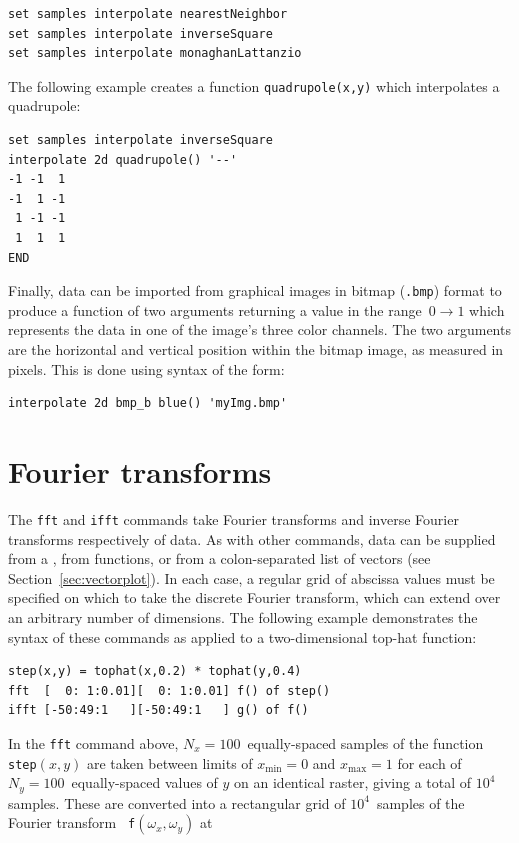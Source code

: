 \begin{verbatim}
set samples interpolate nearestNeighbor
set samples interpolate inverseSquare
set samples interpolate monaghanLattanzio
\end{verbatim}

The following example creates a function {\tt quad\-ru\-pole(x,y)} which interpolates a quadrupole:

\begin{verbatim}
set samples interpolate inverseSquare
interpolate 2d quadrupole() '--'
-1 -1  1
-1  1 -1
 1 -1 -1
 1  1  1
END
\end{verbatim}

Finally, data can be imported from graphical images in bitmap ({\tt .bmp})
format to produce a function of two arguments returning a value in the
range~$0\to1$ which represents the data in one of the image's three color
channels. The two arguments are the horizontal and vertical position within the
bitmap image, as measured in pixels. This is done using syntax of the form:

\begin{verbatim}
interpolate 2d bmp_b blue() 'myImg.bmp'
\end{verbatim}

\section{Fourier transforms}

The {\tt fft} and {\tt ifft} commands take Fourier
transforms and inverse Fourier transforms respectively of data. As with other
commands, data can be supplied from a \datafile, from functions, or from a
colon-separated list of vectors (see Section~\ref{sec:vectorplot}). In each
case, a regular grid of abscissa values must be specified on which to take the
discrete Fourier transform, which can extend over an arbitrary number of
dimensions. The following example demonstrates the syntax of these commands as
applied to a two-dimensional top-hat function:

\begin{verbatim}
step(x,y) = tophat(x,0.2) * tophat(y,0.4)
fft  [  0: 1:0.01][  0: 1:0.01] f() of step()
ifft [-50:49:1   ][-50:49:1   ] g() of f()
\end{verbatim}

\noindent In the {\tt fft} command above, $N_x=100$~equally-spaced samples of
the function {\tt step}$(x,y)$ are taken between limits of $x_\mathrm{min}=0$
and $x_\mathrm{max}=1$ for each of $N_y=100$~equally-spaced values of $y$ on an
identical raster, giving a total of $10^4$ samples. These are converted into a
rectangular grid of $10^4$~samples of the Fourier transform {\tt
f}$(\omega_x,\omega_y)$ at

